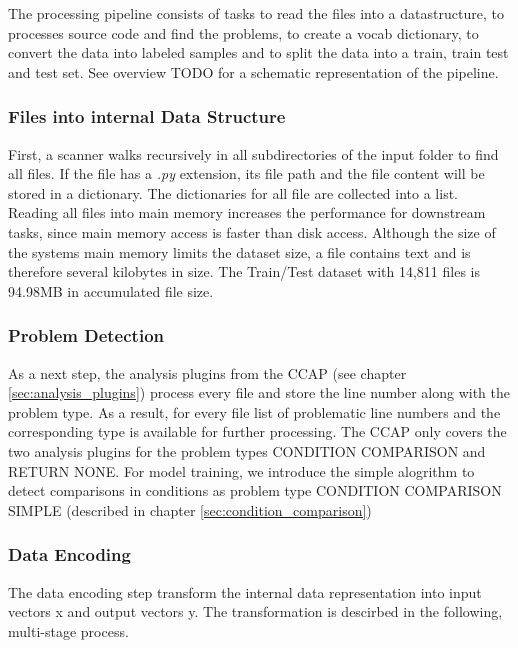 The processing pipeline consists of tasks to read the files into a datastructure, to processes source code and find the problems, to create a vocab dictionary, to convert the data into labeled samples and to split the data into a train, train test and test set. See overview TODO for a schematic representation of the pipeline.

\subsubsection{Files into internal Data Structure}
First, a scanner walks recursively in all subdirectories of the input folder to find all files. If the file has a \textit{.py} extension, its file path and the file content will be stored in a dictionary. The dictionaries for all file are collected into a list. 
Reading all files into main memory increases the performance for downstream tasks, since main memory access is faster than disk access. Although the size of the systems main memory limits the dataset size, a file contains text and is therefore several kilobytes in size. The Train/Test dataset with 14,811 files is 94.98MB in accumulated file size.

\subsubsection{Problem Detection}\label{sec:problem_detection}
As a next step, the analysis plugins from the CCAP (see chapter \ref{sec:analysis_plugins}) process every file and store the line number along with the problem type. As a result, for every file list of problematic line numbers and the corresponding type is available for further processing. The CCAP only covers the two analysis plugins for the problem types CONDITION COMPARISON and RETURN NONE. For model training, we introduce the simple alogrithm to detect comparisons in conditions as problem type CONDITION COMPARISON SIMPLE (described in chapter \ref{sec:condition_comparison})



\subsubsection{Data Encoding}\label{sec:data_encoding}
The data encoding step transform the internal data representation into input vectors x and output vectors y. The transformation is descirbed in the following, multi-stage process.

